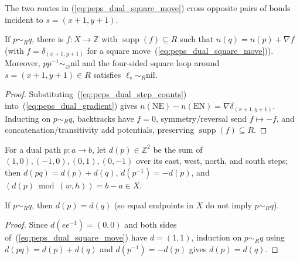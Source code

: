 The two routes in (\ref{eq:peps_dual_square_move}) cross opposite pairs
of bonds incident to $s=(x+1,y+1)$.

\begin{lemma}%
    \label{thm:peps_dual_flux_potential}
    \leanok
    If $p\sim_R q$, there is $f:X\to\mathbb Z$ with $\operatorname{supp}(f)\subseteq R$
    such that $n(q)=n(p)+\nabla f$ (with $f=\delta_{(x+1,y+1)}$ for a square
    move~(\ref{eq:peps_dual_square_move})). Moreover, $pp^{-1}\sim_\varnothing\mathrm{nil}$
    and the four-sided square loop around $s=(x+1,y+1)\in R$ satisfies
    $\ell_s\sim_R\mathrm{nil}$.
\end{lemma}
\begin{proof}\leanok
    Substituting~(\ref{eq:peps_dual_step_counts}) into~(\ref{eq:peps_dual_gradient})
    gives $n(\mathrm{NE})-n(\mathrm{EN})=\nabla\delta_{(x+1,y+1)}$. Inducting on
    $p\sim_R q$, backtracks have $f=0$, symmetry/reversal send $f\mapsto-f$, and
    concatenation/transitivity add potentials, preserving
    $\operatorname{supp}(f)\subseteq R$.
\end{proof}

\begin{definition}%
    \label{def:peps_dual_flux_displacement}
    \leanok
    For a dual path $p:a\to b$, let $d(p)\in\mathbb Z^2$ be the sum of
    $(1,0),(-1,0),(0,1),(0,-1)$ over its east, west, north, and south steps;
    then $d(pq)=d(p)+d(q)$, $d(p^{-1})=-d(p)$, and
    $(d(p)\bmod(w,h))=b-a\in X$.
\end{definition}

\begin{lemma}%
    \label{thm:peps_dual_flux_displacement}
    \leanok
    If $p\sim_R q$, then $d(p)=d(q)$ (so equal endpoints in $X$ do not imply
    $p\sim_R q$).
\end{lemma}
\begin{proof}\leanok
    Since $d(ee^{-1})=(0,0)$ and both sides of~(\ref{eq:peps_dual_square_move})
    have $d=(1,1)$, induction on $p\sim_R q$ using $d(pq)=d(p)+d(q)$ and
    $d(p^{-1})=-d(p)$ gives $d(p)=d(q)$.
\end{proof}

